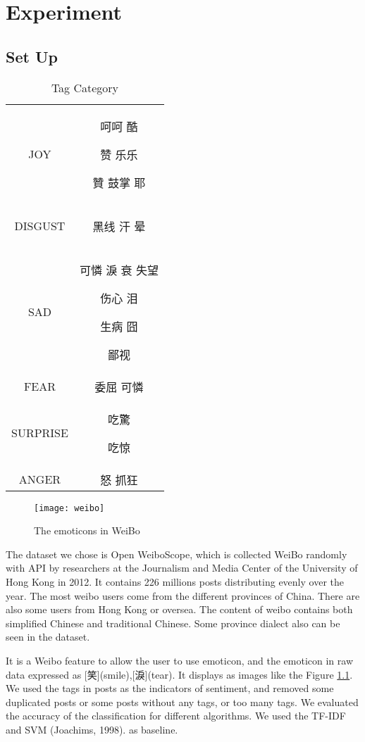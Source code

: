 \chapter{Experiment}

\section{Set Up}

\begin{table}[]
\centering
\caption{Tag Category}
\label{CategoryTable}
\begin{tabular}{|c|c|}
\hline
JOY  & 呵呵 酷 \begin{CJK}{UTF8}{gbsn}赞 乐乐\end{CJK} 贊 鼓掌 耶 \\
DISGUST & \begin{CJK}{UTF8}{gbsn}黑线 汗 晕\end{CJK} \\
SAD &   可憐 淚 衰 失望 \begin{CJK}{UTF8}{gbsn}伤心 泪\end{CJK} 生病 囧 \begin{CJK}{UTF8}{gbsn}鄙视\end{CJK}  \\
FEAR &  委屈  可憐 \\
SURPRISE &  吃驚  \begin{CJK}{UTF8}{gbsn}吃惊\end{CJK} \\
ANGER & 怒 抓狂 \\
\hline
\end{tabular}
\end{table}

\begin{figure}[h]
    \centering
	\texttt{[image: weibo]}
    \caption{The emoticons in WeiBo}
    \label{fig:weibo}
\end{figure}

The dataset we chose is Open WeiboScope\cite{fu2013reality}, which is collected WeiBo randomly with API by researchers at the Journalism and Media Center of the University of Hong Kong in 2012. 
It contains 226 millions posts distributing evenly over the year.  
The most weibo users come from the different provinces of China. There are also some users from Hong Kong or oversea. 
The content of weibo contains both simplified Chinese and traditional Chinese. Some province dialect also can be seen in the dataset.

It is a Weibo feature to allow the user to use emoticon, 
and the emoticon in raw data expressed as [笑](smile),[淚](tear). It displays as images like the Figure \ref{fig:weibo}. 
We used the tags in posts as the indicators of sentiment, and removed some duplicated posts or some posts without any tags, or too many tags. 
We evaluated the accuracy of the classification for different algorithms. We used the TF-IDF and SVM (Joachims, 1998). as baseline.

